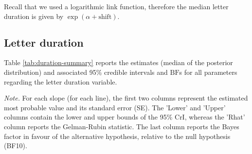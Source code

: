 \documentclass[
  11pt,
  english,
  ,doc,mask,floatsintext]{apa6}
\newenvironment{lltable}{\begin{landscape}\centering\begin{ThreePartTable}}{\end{ThreePartTable}\end{landscape}}
\begin{document}
Recall that we used a logarithmic link function, therefore the median letter duration is given by \(\exp(\alpha + \text{shift})\).

\hypertarget{letter-duration}{%
\subsection{Letter duration}\label{letter-duration}}

Table \ref{tab:duration-summary} reports the estimates (median of the posterior distribution) and associated 95\% credible intervals and \(\text{BF}\)s for all parameters regarding the letter duration variable.

\begin{lltable}

\begin{TableNotes}[para]
\normalsize{\textit{Note.} For each slope (for each line), the first two columns represent the
    estimated most probable value and its standard error (SE). The 'Lower' and
    'Upper' columns contain the lower and upper bounds of the 95\% CrI, whereas
    the 'Rhat' column reports the Gelman-Rubin statistic. The last column reports
    the Bayes factor in favour of the alternative hypothesis, relative to the
    null hypothesis (BF10).}
\end{TableNotes}

\scriptsize{

}
\end{lltable}
\end{document}
